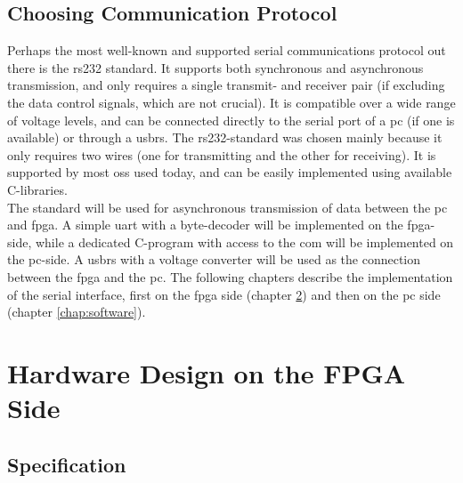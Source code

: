 \documentclass[main.tex]{subfiles}
\begin{document}
\section{Choosing Communication Protocol}
Perhaps the most well-known and supported serial communications protocol out there is the \acrshort{rs232} standard. It supports both synchronous and asynchronous transmission, and only requires a single transmit- and receiver pair (if excluding the data control signals, which are not crucial). It is compatible over a wide range of voltage levels, and can be connected directly to the serial port of a \acrshort{pc} (if one is available) or through a \gls{usbrs}. The \acrshort{rs232}-standard was chosen mainly because it only requires two wires (one for transmitting and the other for receiving). It is supported by most \glspl{os} used today, and can be easily implemented using available C-libraries.\\

The standard will be used for asynchronous transmission of data between the \acrshort{pc} and \gls{fpga}. A simple \gls{uart} with a byte-decoder will be implemented on the \gls{fpga}-side, while a dedicated C-program with access to the \gls{com} will be implemented on the \acrshort{pc}-side. A \gls{usbrs} with a voltage converter will be used as the connection between the \gls{fpga} and the \acrshort{pc}. The following chapters describe the implementation of the serial interface, first on the \gls{fpga} side (chapter \ref{chap:hardware}) and then on the \acrshort{pc} side (chapter \ref{chap:software}).



\chapter{Hardware Design on the FPGA Side} \label{chap:hardware}

\section{Specification}
\end{document}
